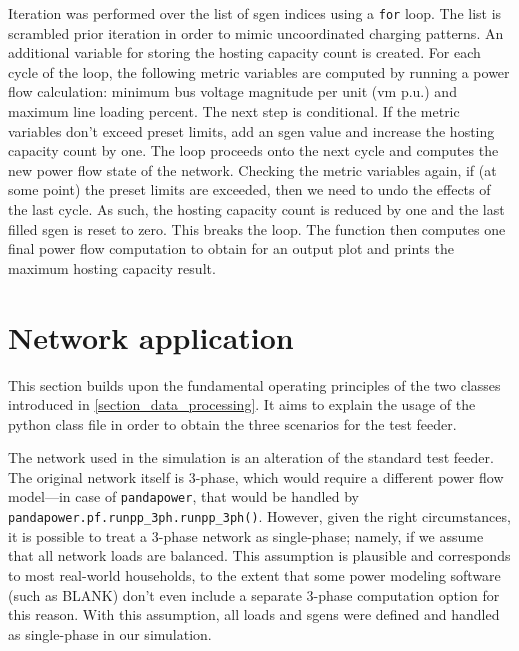 \documentclass[a4paper,10pt]{report}
\begin{document}
Iteration was performed over the list of sgen indices using a \texttt{for} loop. The list is scrambled prior iteration in order to mimic uncoordinated charging patterns. An additional variable for storing the hosting capacity count is created. For each cycle of the loop, the following metric variables are computed by running a power flow calculation: minimum bus voltage magnitude per unit (vm p.u.) and maximum line loading percent. The next step is conditional. If the metric variables don't exceed preset limits, add an sgen value and increase the hosting capacity count by one. The loop proceeds onto the next cycle and computes the new power flow state of the network. Checking the metric variables again, if (at some point) the preset limits are exceeded, then we need to undo the effects of the last cycle. As such, the hosting capacity count is reduced by one and the last filled sgen is reset to zero. This breaks the loop. The function then computes one final power flow computation to obtain for an output plot and prints the maximum hosting capacity result.

\section{Network application}\label{section_network_application}
This section builds upon the fundamental operating principles of the two classes introduced in \cref{section_data_processing}. It aims to explain the usage of the python class file in order to obtain the three scenarios for the test feeder.


The network used in the simulation is an alteration of the standard test feeder. The original network itself is 3-phase, which would require a different power flow model---in case of \texttt{pandapower}, that would be handled by \texttt{pandapower.pf.runpp\_3ph.runpp\_3ph()}. However, given the right circumstances, it is possible to treat a 3-phase network as single-phase; namely, if we assume that all network loads are balanced. This assumption is plausible and corresponds to most real-world households, to the extent that some power modeling software (such as BLANK) don't even include a separate 3-phase computation option for this reason. With this assumption, all loads and sgens were defined and handled as single-phase in our simulation.
\end{document}
